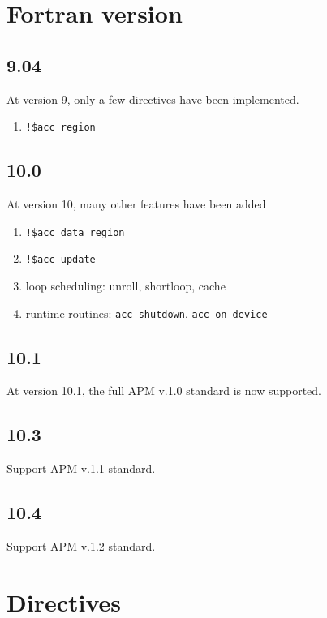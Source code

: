 \section{Fortran version}
\label{sec:fortran-version}


\subsection{9.04}
\label{sec:9.04}

At version 9, only a few directives have been implemented.
\begin{enumerate}
\item \verb.!$acc region.

\end{enumerate}

\subsection{10.0}
\label{sec:10.0}

At version 10, many other features have been added

\begin{enumerate}
\item \verb.!$acc data region.
\item \verb.!$acc update.
\item loop scheduling: unroll, shortloop, cache
\item runtime routines: \verb.acc_shutdown., \verb.acc_on_device.
\end{enumerate}

\subsection{10.1}
\label{sec:10.1}

At version 10.1, the full APM v.1.0 standard is now supported.

\subsection{10.3}
\label{sec:10.3}

Support APM v.1.1 standard.

\subsection{10.4}
\label{sec:10.4}


Support APM v.1.2 standard.

\section{Directives}
\label{sec:directives-1}

